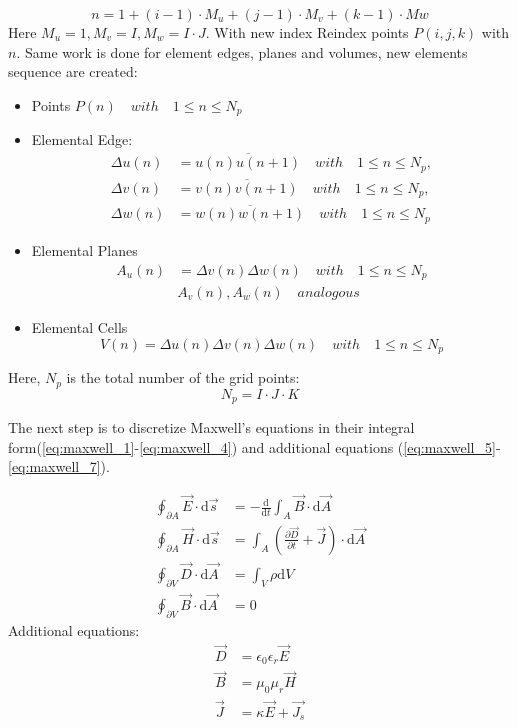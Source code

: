 \begin{equation}
n=1+(i-1)\cdot M_{u}+(j-1)\cdot M_{v}+(k-1)\cdot M{w}
\label{eq:discrete_index}
\end{equation}
Here $M_{u}=1,M_{v}=I,M_{w}=I\cdot J$. With new index
Reindex points $P(i,j,k)$ with $n$. Same work is done for element edges, planes and volumes, new elements sequence are created:
\begin{itemize}
\item Points $P(n) \quad with \quad 1\leq n \leq N_{p}$
\item Elemental Edge:
    \begin{align}
		\Delta u(n)&=\overline{u(n)u(n+1)}  \quad with \quad 1\leq n \leq N_{p}, \nonumber\\
		\Delta v(n)&=\overline{v(n)v(n+1)}  \quad with \quad 1\leq n \leq N_{p}, \nonumber\\
		\Delta w(n)&=\overline{w(n)w(n+1)}  \quad with \quad 1\leq n \leq N_{p}
		\label{eq:discrete_edge_n}
		\end{align}
\item Elemental Planes
		\begin{align}
		A_{u}(n)&=\Delta v(n)\Delta w(n) \quad with \quad 1\leq n\leq N_{p}\nonumber\\
		&A_{v}(n),A_{w}(n)  \quad analogous
		\label{eq:discrete_plane_n}
		\end{align}
\item Elemental Cells
		\begin{equation}
		V(n)=\Delta u(n)\Delta v(n)\Delta w(n)  \quad with \quad 1\leq n\leq N_{p}
		\label{eq:discrete_cell_n}
		\end{equation}
\end{itemize}
Here, $N_{p}$ is the total number of the grid points:
\begin{equation}
N_{p}=I\cdot J\cdot K
\label{eq:np}
\end{equation}

The next step is to discretize Maxwell's equations in their integral form(\ref{eq:maxwell_1}-\ref{eq:maxwell_4}) and additional equations (\ref{eq:maxwell_5}-\ref{eq:maxwell_7}).

\begin{align}
\oint_{\partial A}\vec{E}\cdot\mathrm{d}\vec{s}&=
-\frac{\mathrm{d}}{\mathrm{d}t}\int_{A}\vec{B}\cdot\mathrm{d}\vec{A}
\label{eq:maxwell_1}\\
\oint_{\partial A}\vec{H}\cdot\mathrm{d}\vec{s}&=
\int_{A}(\frac{\partial\vec{D}}{\partial t}+\vec{J})\cdot\mathrm{d}\vec{A}
\label{eq:maxwell_2}\\
\oint_{\partial V}\vec{D}\cdot\mathrm{d}\vec{A}&=
\int_{V}\rho\mathrm{d}V
\label{eq:maxwell_3}\\
\oint_{\partial V}\vec{B}\cdot\mathrm{d}\vec{A}&=0
\label{eq:maxwell_4}
\end{align}
Additional equations:
\begin{align}
\vec{D}&=\epsilon_{0}\epsilon_{r}\vec{E}
\label{eq:maxwell_5}\\
\vec{B}&=\mu_{0}\mu_{r}\vec{H}
\label{eq:maxwell_6}\\
\vec{J}&=\kappa\vec{E}+\vec{J_{s}}
\label{eq:maxwell_7}
\end{align}

